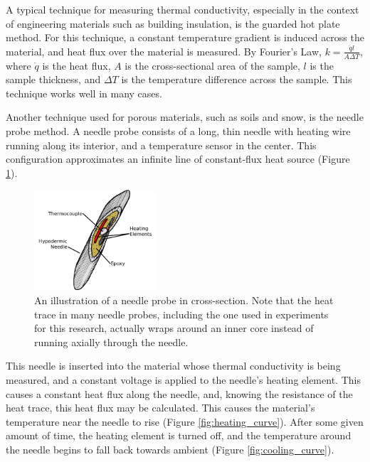 A typical technique for measuring thermal conductivity, especially in the
context of engineering materials such as building insulation, is the guarded
hot plate method. For this technique, a constant temperature gradient is induced across
the material, and heat flux over the material is measured.  By Fourier's Law,
\(k = \frac{\dot{q}l}{A\Delta T}\), where \(\dot{q}\) is the heat flux, \(A\) is
the cross-sectional area of the sample, \(l\) is the sample thickness, and 
\(\Delta T\) is the temperature difference across the sample. This technique
works well in many cases.

Another technique used for porous materials, such as soils and snow, is the
needle probe method. A needle probe consists of a long, thin needle with heating
wire running along its interior, and a temperature sensor in the center. This
configuration approximates an infinite line of constant-flux heat source
(Figure \ref{fig:needle_xsect}). \cite{basictheory}

\begin{figure}[h]
\centering
\includegraphics[width=0.4\textwidth]{fig/needle_xsect.png}
\caption{An illustration of a needle probe in cross-section. Note that the heat
trace in many needle probes, including the one used in experiments for this
research, actually wraps around an inner core instead of running axially through
the needle.}
\label{fig:needle_xsect}
\end{figure}

This needle is inserted into the material whose thermal conductivity is being
measured, and a constant voltage is applied to the needle's heating element.
This causes a constant heat flux along the needle, and, knowing the resistance
of the heat trace, this heat flux may be calculated. This causes the material's
temperature near the needle to rise (Figure \ref{fig:heating_curve}). After some
given amount of time, the heating element is turned off, and the temperature
around the needle begins to fall back towards ambient (Figure \ref{fig:cooling_curve}).



